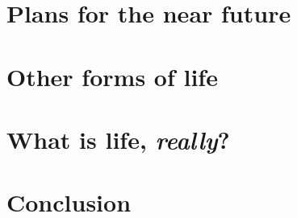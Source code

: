\documentclass[DIV=calc, paper=a4, fontsize=12pt]{scrartcl}	 %
\begin{document}





\section{Plans for the near future}

\begin{multicols}{2}






\end{multicols}

\noindent\makebox[\linewidth]{\rule{\textwidth}{0.4pt}}

\section{Other forms of life}

\begin{multicols}{2}



\end{multicols}

\noindent\makebox[\linewidth]{\rule{\textwidth}{0.4pt}}


\section{What is life, \textit{really}?}

\begin{multicols}{2}





\end{multicols}

\section{Conclusion}
\end{document}
